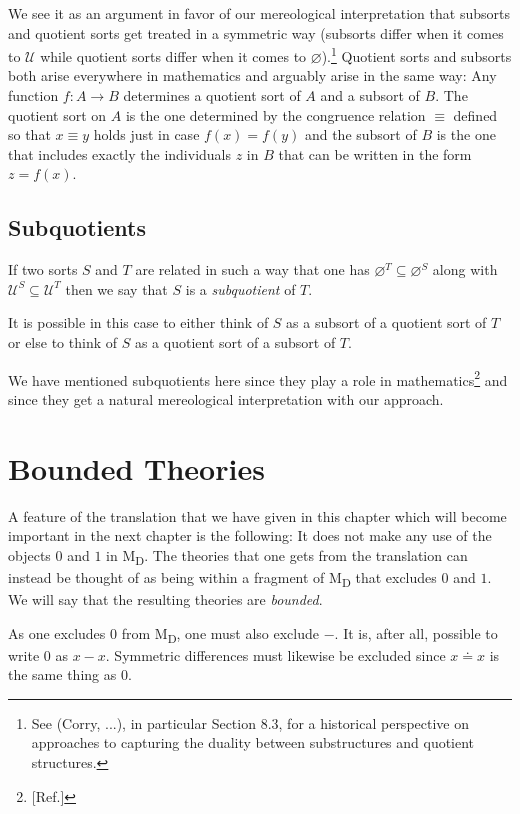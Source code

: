 \documentclass[12pt]{book}
\begin{document}
We see it as an argument in favor of our mereological interpretation that subsorts and quotient sorts get treated in a symmetric way (subsorts differ when it comes to $\mathcal{U}$ while quotient sorts differ when it comes to $\varnothing$).\footnote{See (Corry, ...), in particular Section 8.3, for a historical perspective on approaches to capturing the duality between substructures and quotient structures.} Quotient sorts and subsorts both arise everywhere in mathematics and arguably arise in the same way: Any function $f: A \rightarrow B$ determines a quotient sort of $A$ and a subsort of $B$. The quotient sort on $A$ is the one determined by the congruence relation $\equiv$ defined so that $x \equiv y$ holds just in case $f(x) = f(y)$ and the subsort of $B$ is the one that includes exactly the individuals $z$ in $B$ that can be written in the form $z = f(x)$.

\subsection{Subquotients} \label{subquotients}
If two sorts $S$ and $T$ are related in such a way that one has $\varnothing^T \subseteq \varnothing^S$ along with $\mathcal{U}^S \subseteq \mathcal{U}^T$ then we say that $S$ is a \textit{subquotient} of $T$.

It is possible in this case to either think of $S$ as a subsort of a quotient sort of $T$ or else to think of $S$ as a quotient sort of a subsort of $T$.

We have mentioned subquotients here since they play a role in mathematics\footnote{[Ref.]} and since they get a natural mereological interpretation with our approach.

\section{Bounded Theories} \label{bounded_theories}
A feature of the translation that we have given in this chapter which will become important in the next chapter is the following: It does not make any use of the objects $0$ and $1$ in M\textsubscript{D}. The theories that one gets from the translation can instead be thought of as being within a fragment of M\textsubscript{D} that excludes $0$ and $1$. We will say that the resulting theories are \textit{bounded}.

As one excludes $0$ from M\textsubscript{D}, one must also exclude $-$. It is, after all, possible to write $0$ as $x - x$. Symmetric differences must likewise be excluded since $x \doteq x$ is the same thing as $0$.
\end{document}
